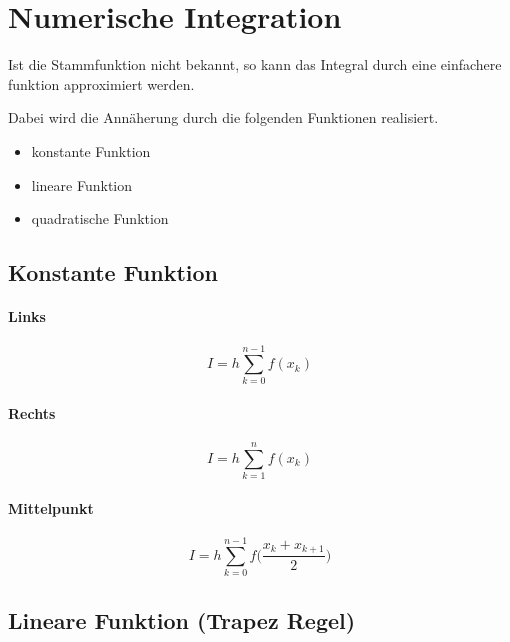 \section{Numerische Integration}

Ist die Stammfunktion nicht bekannt, so kann das Integral durch eine
einfachere funktion approximiert werden.

Dabei wird die Annäherung durch die folgenden Funktionen realisiert.

\begin{itemize}
    \item konstante Funktion
    \item lineare Funktion
    \item quadratische Funktion
\end{itemize}

\subsection{Konstante Funktion}

\paragraph{Links}

\begin{displaymath}
    I = h \sum_{k=0}^{n-1} f(x_k)
\end{displaymath}

\paragraph{Rechts}

\begin{displaymath}
    I = h \sum_{k=1}^{n} f(x_k)
\end{displaymath}

\paragraph{Mittelpunkt}

\begin{displaymath}
    I = h \sum_{k=0}^{n-1} f \biggl (\frac{x_k + x_{k+1}}{2} \biggr )
\end{displaymath}

\subsection{Lineare Funktion (Trapez Regel)}

